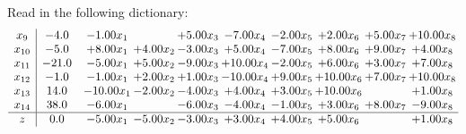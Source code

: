 \documentclass[9pt]{article}
\begin{document}
Read in the following dictionary:
\[\begin{array}{c| c c@{\hskip 2pt} c@{\hskip 2pt} c@{\hskip 2pt} c@{\hskip 2pt} c@{\hskip 2pt} c@{\hskip 2pt} c@{\hskip 2pt} c@{\hskip 2pt} }
 x_{9}   &  -4.0 & -1.00 x_{1} &   & +  5.00 x_{3} & -7.00 x_{4} & -2.00 x_{5} & +  2.00 x_{6} & +  5.00 x_{7} & + 10.00 x_{8}\\
 x_{10}   &  -5.0 & +  8.00 x_{1} & +  4.00 x_{2} & -3.00 x_{3} & +  5.00 x_{4} & -7.00 x_{5} & +  8.00 x_{6} & +  9.00 x_{7} & +  4.00 x_{8}\\
 x_{11}   &  -21.0 & -5.00 x_{1} & +  5.00 x_{2} & -9.00 x_{3} & + 10.00 x_{4} & -2.00 x_{5} & +  6.00 x_{6} & +  3.00 x_{7} & +  7.00 x_{8}\\
 x_{12}   &  -1.0 & -1.00 x_{1} & +  2.00 x_{2} & +  1.00 x_{3} & -10.00 x_{4} & +  9.00 x_{5} & + 10.00 x_{6} & +  7.00 x_{7} & + 10.00 x_{8}\\
 x_{13}   &  14.0 & -10.00 x_{1} & -2.00 x_{2} & -4.00 x_{3} & +  4.00 x_{4} & +  3.00 x_{5} & + 10.00 x_{6} &   & +  1.00 x_{8}\\
 x_{14}   &  38.0 & -6.00 x_{1} &   & -6.00 x_{3} & -4.00 x_{4} & -1.00 x_{5} & +  3.00 x_{6} & +  8.00 x_{7} & -9.00 x_{8}\\
\hline
z    &  0.0 & -5.00 x_{1} & -5.00 x_{2} & -3.00 x_{3} & +  3.00 x_{4} & +  4.00 x_{5} & +  5.00 x_{6} &   & +  1.00 x_{8}\\
\end{array}\]
\end{document}
